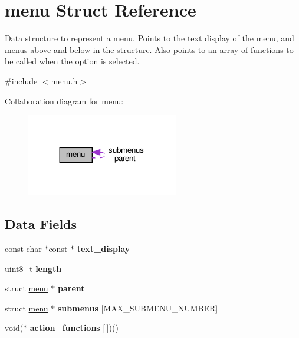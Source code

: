 \hypertarget{structmenu}{}\section{menu Struct Reference}
\label{structmenu}


Data structure to represent a menu. Points to the text display of the menu, and menus above and below in the structure. Also points to an array of functions to be called when the option is selected.  




{\ttfamily \#include $<$menu.\+h$>$}



Collaboration diagram for menu\+:\nopagebreak
\begin{figure}[H]
\begin{center}
\leavevmode
\includegraphics[width=188pt]{structmenu__coll__graph}
\end{center}
\end{figure}
\subsection*{Data Fields}
\begin{DoxyCompactItemize}
\item 
\mbox{\label{structmenu_a9cf30093128a1f582de1bdfc1b94c784}} 
const char $\ast$const  $\ast$ {\bfseries text\+\_\+display}
\item 
\mbox{\label{structmenu_ae5f3af0d2cf600f97e3e6011b09cdcf6}} 
uint8\+\_\+t {\bfseries length}
\item 
\mbox{\label{structmenu_ab37f2faa5398d13b27ca50dcfd4e36e4}} 
struct \hyperlink{structmenu}{menu} $\ast$ {\bfseries parent}
\item 
\mbox{\label{structmenu_a20d5717eb42d807da8fe68a8c0a5eaf6}} 
struct \hyperlink{structmenu}{menu} $\ast$ {\bfseries submenus} \mbox{[}M\+A\+X\+\_\+\+S\+U\+B\+M\+E\+N\+U\+\_\+\+N\+U\+M\+B\+ER\mbox{]}
\item 
\mbox{\label{structmenu_ac32370935be0b516b01cd4cc6d0cf827}} 
void($\ast$ {\bfseries action\+\_\+functions} \mbox{[}$\,$\mbox{]})()
\end{DoxyCompactItemize}


